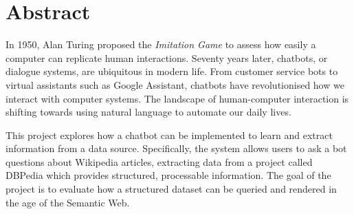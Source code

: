\chapter*{Abstract}
In 1950, Alan Turing proposed the {\it Imitation Game} to assess how easily a computer can replicate human interactions. Seventy years later, chatbots, or dialogue systems, are ubiquitous in modern life. From customer service bots to virtual assistants such as Google Assistant, chatbots have revolutionised how we interact with computer systems. The landscape of human-computer interaction is shifting towards using natural language to automate our daily lives.

This project explores how a chatbot can be implemented to learn and extract information from a data source. Specifically, the system allows users to ask a bot questions about Wikipedia articles, extracting data from a project called DBPedia which provides structured, processable information. The goal of the project is to evaluate how a structured dataset can be queried and rendered in the age of the Semantic Web.